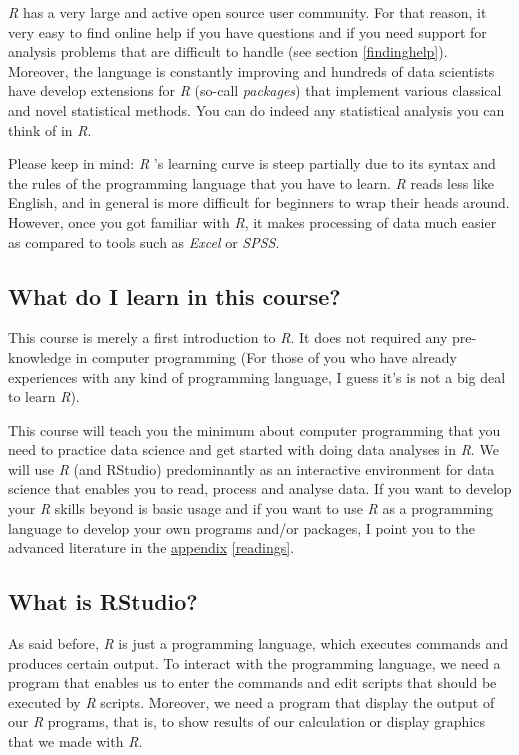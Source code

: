 \documentclass[
]{scrartcl}
\begin{document}
\emph{R} has a very large and active open source user community. For that reason, it very easy to find online help if you have questions and if you need support for analysis problems that are difficult to handle (see section \ref{findinghelp}). Moreover, the language is constantly improving and hundreds of data scientists have develop extensions for \emph{R} (so-call \emph{packages}) that implement various classical and novel statistical methods. You can do indeed any statistical analysis you can think of in \emph{R}.

Please keep in mind: \emph{R} 's learning curve is steep partially due to its syntax and the rules of the programming language that you have to learn. \emph{R} reads less like English, and in general is more difficult for beginners to wrap their heads around. However, once you got familiar with \emph{R}, it makes processing of data much easier as compared to tools such as \emph{Excel} or \emph{SPSS}.

\subsection{What do I learn in this course?}\label{what-do-i-learn-in-this-course}

This course is merely a first introduction to \emph{R}. It does not required any pre-knowledge in computer programming (For those of you who have already experiences with any kind of programming language, I guess it's is not a big deal to learn \emph{R}).

This course will teach you the minimum about computer programming that you need to practice data science and get started with doing data analyses in \emph{R}. We will use \emph{R} (and RStudio) predominantly as an interactive environment for data science that enables you to read, process and analyse data. If you want to develop your \emph{R} skills beyond is basic usage and if you want to use \emph{R} as a programming language to develop your own programs and/or packages, I point you to the advanced literature in the \hyperref[readings]{appendix} \ref{readings}.

\subsection{What is RStudio?}\label{what-is-rstudio}

As said before, \emph{R} is just a programming language, which executes commands and produces certain output. To interact with the programming language, we need a program that enables us to enter the commands and edit scripts that should be executed by \emph{R} scripts. Moreover, we need a program that display the output of our \emph{R} programs, that is, to show results of our calculation or display graphics that we made with \emph{R}.
\end{document}
